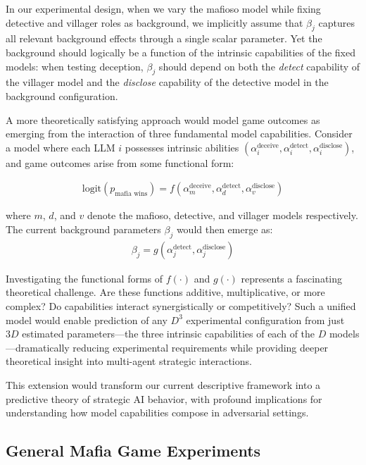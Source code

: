\documentclass{article}
\begin{document}
In our experimental design, when we vary the mafioso model while fixing detective and villager roles as background, we implicitly assume that $\beta_j$ captures all relevant background effects through a single scalar parameter. Yet the background should logically be a function of the intrinsic capabilities of the fixed models: when testing deception, $\beta_j$ should depend on both the \textit{detect} capability of the villager model and the \textit{disclose} capability of the detective model in the background configuration.

A more theoretically satisfying approach would model game outcomes as emerging from the interaction of three fundamental model capabilities. Consider a model where each LLM $i$ possesses intrinsic abilities $(\alpha_i^{\text{deceive}}, \alpha_i^{\text{detect}}, \alpha_i^{\text{disclose}})$, and game outcomes arise from some functional form:

\begin{align}
\text{logit}(p_{\text{mafia wins}}) = f(\alpha_m^{\text{deceive}}, \alpha_d^{\text{detect}}, \alpha_v^{\text{disclose}})
\end{align}

where $m$, $d$, and $v$ denote the mafioso, detective, and villager models respectively. The current background parameters $\beta_j$ would then emerge as:
\begin{align}
\beta_j = g(\alpha_j^{\text{detect}}, \alpha_j^{\text{disclose}})
\end{align}

Investigating the functional forms of $f(\cdot)$ and $g(\cdot)$ represents a fascinating theoretical challenge. Are these functions additive, multiplicative, or more complex? Do capabilities interact synergistically or competitively? Such a unified model would enable prediction of any $D^3$ experimental configuration from just $3D$ estimated parameters—the three intrinsic capabilities of each of the $D$ models—dramatically reducing experimental requirements while providing deeper theoretical insight into multi-agent strategic interactions.

This extension would transform our current descriptive framework into a predictive theory of strategic AI behavior, with profound implications for understanding how model capabilities compose in adversarial settings.

\subsection{General Mafia Game Experiments}
\end{document}
